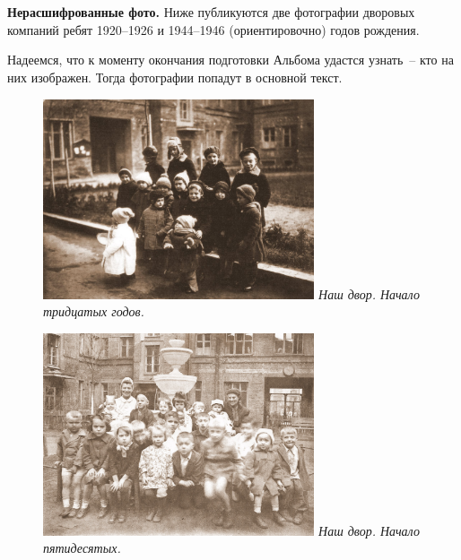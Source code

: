 \chapter{}



\textbf{Нерасшифрованные фото.} Ниже публикуются две фотографии дворовых компаний ребят 1920--1926 и 1944--1946 (ориентировочно) годов рождения.

Надеемся, что к моменту окончания подготовки Альбома удастся узнать~-- кто на них изображен. Тогда фотографии попадут в основной текст.

\vspace{10pt}

\begin{figure}[ht!]
    \begin{minipage}{80mm}
        \includegraphics[width=80mm]{inc/95/1}
        \footnotesize{\textit{Наш двор. Начало тридцатых годов.}}
     \end{minipage}
\end{figure}

\vspace{10pt}

\begin{figure}[h!]
\begin{minipage}{80mm}
    \includegraphics[width=80mm]{inc/95/2}
    \footnotesize{\textit{Наш двор. Начало пятидесятых.}}
\end{minipage}
\end{figure}

